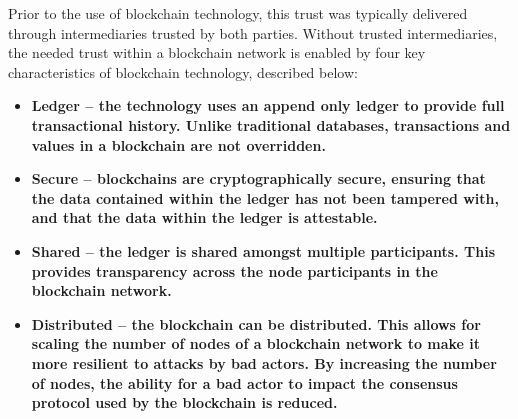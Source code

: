  Prior to the use of blockchain
technology, this trust was typically delivered through intermediaries trusted by both parties.
Without trusted intermediaries, the needed trust within a blockchain network is enabled by four
key characteristics of blockchain technology, described below:
\begin{itemize}
\item \bf{Ledger} – the technology uses an append only ledger to provide full transactional history.
Unlike traditional databases, transactions and values in a blockchain are not overridden.
\item \bf{Secure} – blockchains are cryptographically secure, ensuring that the data contained
within the ledger has not been tampered with, and that the data within the ledger is
attestable.
\item \bf{Shared} – the ledger is shared amongst multiple participants. This provides transparency
across the node participants in the blockchain network.
\item \bf{Distributed} – the blockchain can be distributed. This allows for scaling the number of
nodes of a blockchain network to make it more resilient to attacks by bad actors. By
increasing the number of nodes, the ability for a bad actor to impact the consensus
protocol used by the blockchain is reduced.
\end{itemize}

